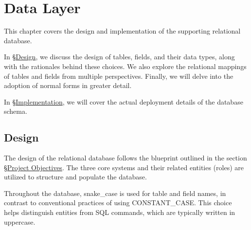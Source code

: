 \documentclass[12pt]{report}
\newcommand{\n}{\par}
\newcommand{\br}{\n\vspace{1 em}\n}
\begin{document}
\chapter{Data Layer} \label{data-layer}
This chapter covers the design and implementation of the supporting relational database.
\br
In \S \hyperref[data-layer.design]{Design},
we discuss the design of tables, fields, and their data types, along with the rationales behind these choices.
We also explore the relational mappings of tables and fields from multiple perspectives.
Finally, we will delve into the adoption of normal forms in greater detail.\n
In \S \hyperref[data-layer.implementation]{Implementation},
we will cover the actual deployment details of the database schema.



\section{Design} \label{data-layer.design}
The design of the relational database follows the blueprint outlined in the section \S \hyperref[overview.project-objectives]{Project Objectives}.
The three core systems and their related entities (roles) are utilized to structure and populate the database.
\br
Throughout the database, snake\_case is used for table and field names, in contrast to conventional practices of using CONSTANT\_CASE.
This choice helps distinguish entities from SQL commands, which are typically written in uppercase.
\end{document}
